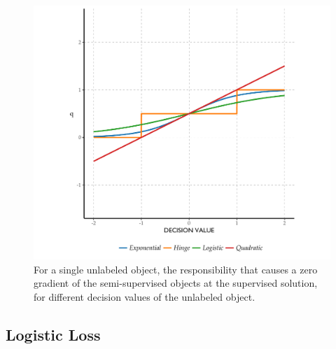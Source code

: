 \documentclass[twoside]{memoir}\usepackage[]{graphicx}\usepackage{xcolor}
\makeatletter
\def\maxwidth{ %
  \ifdim\Gin@nat@width>\linewidth
    \linewidth
  \else
    \Gin@nat@width
  \fi
}
\newenvironment{knitrout}{}{} %
\makeatother
\begin{document}
\begin{knitrout}
\color{fgcolor}\begin{figure}
\includegraphics[width=\maxwidth]{figure/responsibilities-1} \caption[For a single unlabeled object, the responsibility that causes a zero gradient of the semi-supervised objects at the supervised solution, for different decision values of the unlabeled object]{For a single unlabeled object, the responsibility that causes a zero gradient of the semi-supervised objects at the supervised solution, for different decision values of the unlabeled object.}\label{figure:responsibilities}
\end{figure}


\end{knitrout}

\subsection{Logistic Loss}
\end{document}
